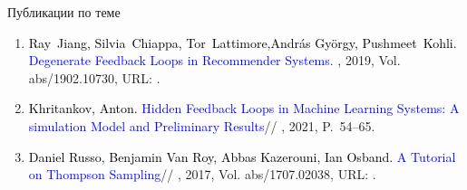 \documentclass{beamer}
\begin{document}
\begin{frame}{Публикации по теме}
\begin{enumerate}
    \item
      \textcolor{black}{Ray~Jiang, Silvia~Chiappa, Tor~Lattimore,Andr{\'a}s Gy{\"o}rgy, Pushmeet~Kohli.}
      \textcolor{blue}{Degenerate Feedback Loops in Recommender Systems}.
    , 2019, Vol. abs/1902.10730,
	  URL: .

  \item
    \textcolor{black}{Khritankov, Anton.}
    \textcolor{blue}{Hidden Feedback Loops in Machine Learning Systems: A simulation Model and Preliminary Results}//
    , 2021, P.~54--65.

  \item
    \textcolor{black}{Daniel Russo, Benjamin Van Roy, Abbas Kazerouni, Ian Osband.}
    \textcolor{blue}{A Tutorial on Thompson Sampling}//
    , 2017, Vol. abs/1707.02038,
	  URL: .
  \end{enumerate}
\end{frame}
\end{document}
